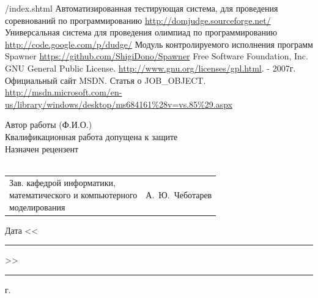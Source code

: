 \documentclass{imcs}
\begin{document}
\begin{thebibliography}{99}
{/index.shtml}
 Автоматизированная тестирующая система, для проведения соревнований по программированию \url{http://domjudge.sourceforge.net/}
 Универсальная система для проведения олимпиад по программированию \url{http://code.google.com/p/dudge/}
 Модуль контролируемого исполнения программ Spawner \url{https://github.com/ShigiDono/Spawner}
 Free Software Foundation, Inc. GNU General Public License. \url{http://www.gnu.org/licenses/gpl.html}. - 2007г.
 Официальный сайт MSDN. Статья о JOB\_OBJECT. \url{http://msdn.microsoft.com/en-us/library/windows/desktop/ms684161\%28v=vs.85\%29.aspx}

  

  
\end{thebibliography}

\pagebreak

\noindent Автор работы  (Ф.И.О.)\\

\noindent{}Квалификационная работа допущена к защите\\

\noindent{}Назначен рецензент\\
\\

\vspace{2\baselineskip}
\noindent\begin{tabular}{p{} p{}}
\parbox{8cm}{Зав. кафедрой информатики,\\ математического и компьютерного\\ моделирования} &
\hfill А.~Ю.~Чеботарев\\
\end{tabular}
\vspace{2\baselineskip}
\begin{flushright}
Дата <<\rule{1cm}{0.5pt}>>\rule{3cm}{0.5pt} г.
\end{flushright}
\end{document}
